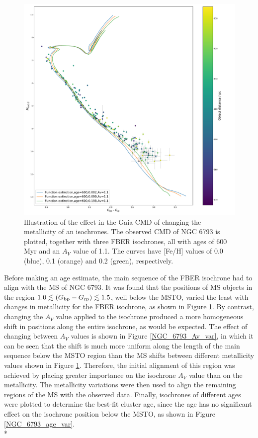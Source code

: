 \documentclass[12pt, a4paper]{report}
\begin{document}
\begin{figure}[h!]
\begin{center}
\includegraphics[width=1.0\textwidth]{../NGC_6793_CMD_FeH_0p002_0p099_0p198_Av_1p1_600Myr_isochrones_func_errorbars_T5k.pdf}
\caption{Illustration of the effect in the Gaia CMD of changing the metallicity of an isochrones. The observed CMD of NGC 6793 is plotted, together with three FBER isochrones, all with ages of 600 Myr and an $A_{V}$ value of 1.1. The curves have [Fe/H] values of 0.0 (blue), 0.1 (orange) and 0.2 (green), respectively.}
\label{NGC_6793_metal_var}
\end{center}
\end{figure}


Before making an age estimate, the main sequence of the FBER isochrone had to align with the MS of NGC 6793. It was found that the positions of MS objects in the region $1.0 \lesssim (G_{\textnormal{bp}}-G_{\textnormal{rp}}) \lesssim 1.5$, well below the MSTO, varied the least with changes in metallicity for the FBER isochrone, as shown in Figure \ref{NGC_6793_metal_var}. By contrast, changing the $A_{V}$ value applied to the isochrone produced a more homogeneous shift in positions along the entire isochrone, as would be expected. The effect of changing between $A_{V}$ values is shown in Figure \ref{NGC_6793_Av_var}, in which it can be seen that the shift is much more uniform along the length of the main sequence below the MSTO region than the MS shifts between different metallicity values shown in Figure \ref{NGC_6793_metal_var}. Therefore, the initial alignment of this region was achieved by placing greater importance on the isochrone $A_{V}$ value than on the metallicity. The metallicity variations were then used to align the remaining regions of the MS with the observed data. Finally, isochrones of different ages were plotted to determine the best-fit cluster age, since the age has no significant effect on the isochrone position below the MSTO, as shown in Figure \ref{NGC_6793_age_var}. \\*
\end{document}
